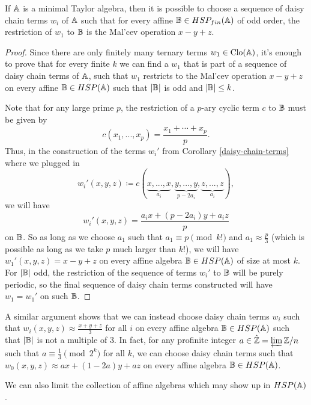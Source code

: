 \documentclass[letterpaper,11pt]{article}
\DeclareMathOperator{\Clo}{Clo}
\begin{document}
\begin{prop} If $\mathbb{A}$ is a minimal Taylor algebra, then it is possible to choose a sequence of daisy chain terms $w_i$ of $\mathbb{A}$ such that for every affine $\mathbb{B} \in HSP_{fin}(\mathbb{A})$ of odd order, the restriction of $w_1$ to $\mathbb{B}$ is the Mal'cev operation $x-y+z$.
\end{prop}
\begin{proof} Since there are only finitely many ternary terms $w_1 \in \Clo(\bA)$, it's enough to prove that for every finite $k$ we can find a $w_1$ that is part of a sequence of daisy chain terms of $\mathbb{A}$, such that $w_1$ restricts to the Mal'cev operation $x-y+z$ on every affine $\mathbb{B} \in HSP(\mathbb{A})$ such that $|\mathbb{B}|$ is odd and $|\mathbb{B}| \le k$.

Note that for any large prime $p$, the restriction of a $p$-ary cyclic term $c$ to $\mathbb{B}$ must be given by
\[
c(x_1, ..., x_p) = \frac{x_1 + \cdots + x_p}{p}.
\]
Thus, in the construction of the terms $w_i'$ from Corollary \ref{daisy-chain-terms} where we plugged in
\[
w_i'(x,y,z) \coloneqq c(\underbrace{x,...,x}_{a_i}, \underbrace{y,...,y}_{p-2a_i}, \underbrace{z,...,z}_{a_i}),
\]
we will have
\[
w_i'(x,y,z) = \frac{a_ix + (p-2a_i)y + a_iz}{p}
\]
on $\mathbb{B}$. So as long as we choose $a_1$ such that $a_1 \equiv p \pmod{k!}$ and $a_1 \approx \frac{p}{3}$ (which is possible as long as we take $p$ much larger than $k!$), we will have $w_1'(x,y,z) = x-y+z$ on every affine algebra $\mathbb{B} \in HSP(\mathbb{A})$ of size at most $k$. For $|\mathbb{B}|$ odd, the restriction of the sequence of terms $w_i'$ to $\mathbb{B}$ will be purely periodic, so the final sequence of daisy chain terms constructed will have $w_1 = w_1'$ on such $\mathbb{B}$.
\end{proof}

\begin{rem} A similar argument shows that we can instead choose daisy chain terms $w_i$ such that $w_i(x,y,z) \approx \frac{x+y+z}{3}$ for all $i$ on every affine algebra $\mathbb{B} \in HSP(\mathbb{A})$ such that $|\mathbb{B}|$ is not a multiple of $3$. In fact, for any profinite integer $a \in \hat{\mathbb{Z}} = \varprojlim \mathbb{Z}/n$ such that $a \equiv \frac{1}{3} \pmod{2^k}$ for all $k$, we can choose daisy chain terms such that $w_0(x,y,z) \approx ax + (1-2a)y + az$ on every affine algebra $\mathbb{B} \in HSP(\mathbb{A})$.
\end{rem}

We can also limit the collection of affine algebras which may show up in $HSP(\mathbb{A})$.
\end{document}
